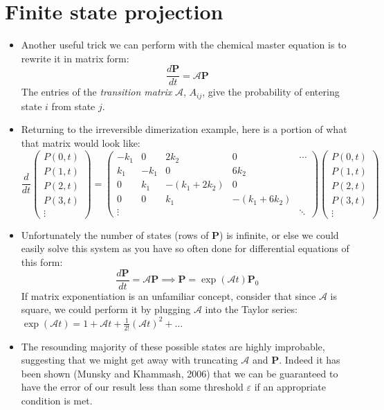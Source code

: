 \documentclass{article}
\begin{document}
\section*{Finite state projection}
\begin{itemize}
\item Another useful trick we can perform with the chemical master equation is to rewrite it in matrix form:
\[ \frac{d\mathbf{P}}{dt} = \mathcal{A} \mathbf{P} \]
The entries of the \textit{transition matrix} $\mathcal{A}$, $A_{ij}$, give the probability of entering state $i$ from state $j$.
\item Returning to the irreversible dimerization example, here is a portion of what that matrix would look like:
\[ \frac{d}{dt} \begin{pmatrix} P(0,t) \\ P(1,t) \\ P(2,t) \\ P(3,t) \\ \vdots \end{pmatrix} = \begin{pmatrix} 
-k_1 & 0 & 2 k_2 & 0 & \cdots\\
k_1 & -k_1 & 0 & 6k_2 & \\
0 & k_1 & -(k_1 + 2k_2) & 0 & \\
0 & 0 & k_1 & -(k_1+6k_2) & \\
\vdots & & && \ddots \end{pmatrix} \begin{pmatrix} P(0,t) \\ P(1,t) \\ P(2,t) \\ P(3,t) \\ \vdots \end{pmatrix} \]
\item Unfortunately the number of states (rows of $\mathbf{P}$) is infinite, or else we could easily solve this system as you have so often done for differential equations of this form:
\[\frac{d\mathbf{P}}{dt} = \mathcal{A} \mathbf{P} \implies  \mathbf{P} = \exp\left(\mathcal{A} t\right) \mathbf{P}_0  \]
If matrix exponentiation is an unfamiliar concept, consider that since $\mathcal{A}$ is square, we could perform it by plugging $\mathcal{A}$ into the Taylor series: $\exp(\mathcal{A}t) = 1 + \mathcal{A}t + \frac{1}{2!}\left(\mathcal{A}t\right)^2 + \ldots$
\item The resounding majority of these possible states are highly improbable, suggesting that we might get away with truncating $\mathcal{A}$ and $\mathbf{P}$. Indeed it has been shown (Munsky and Khammash, 2006) that we can be guaranteed to have the error of our result less than some threshold $\varepsilon$ if an appropriate condition is met.

\end{itemize}
\end{document}
